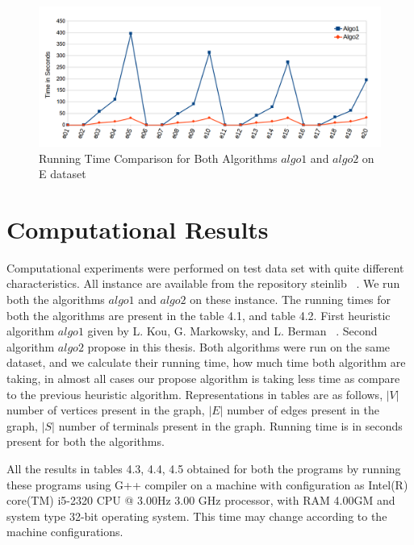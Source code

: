  \begin{figure}[H]
      \centering
    \includegraphics[scale = 0.45]{anilfinal.png}
  \caption{Running Time Comparison for Both Algorithms $algo1$ and $algo2$ on E dataset}
\end{figure}


\section{Computational Results}
Computational experiments were performed on test data set with quite different characteristics. All instance are available from the repository steinlib ~\cite{koch}. We run both the algorithms $algo1$ and $algo2$ on these instance. The running times for both the algorithms are present in the table 4.1, and table 4.2. First heuristic algorithm $algo1$ given by L. Kou, G. Markowsky, and L. Berman ~\cite{markowsky}. Second algorithm $algo2$ propose in this thesis. Both algorithms were run on the same dataset, and we calculate their running time, how much time both algorithm are taking, in almost all cases our propose algorithm is taking less time as compare to the previous heuristic algorithm. Representations in tables are as follows, $|V|$ number of vertices present in the graph, $|E|$ number of edges present in the graph, $|S|$ number of terminals present in the graph. Running time is in seconds present for both the algorithms. 

All the results in tables 4.3, 4.4, 4.5 obtained for both the programs by running these programs using G++ compiler on a machine with configuration as Intel(R) core(TM) i5-2320 CPU @ 3.00Hz 3.00 GHz processor, with RAM 4.00GM and system type 32-bit operating system. This time may change according to the machine configurations.
    

